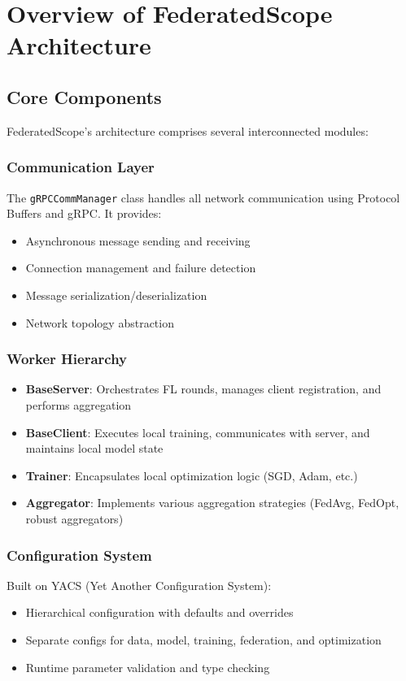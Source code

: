 \documentclass[11pt,conference]{article}
\begin{document}
\section{Overview of FederatedScope Architecture}

\subsection{Core Components}

FederatedScope's architecture comprises several interconnected modules:

\subsubsection{Communication Layer}
The \texttt{gRPCCommManager} class handles all network communication using Protocol Buffers and gRPC. It provides:
\begin{itemize}
    \item Asynchronous message sending and receiving
    \item Connection management and failure detection
    \item Message serialization/deserialization
    \item Network topology abstraction
\end{itemize}

\subsubsection{Worker Hierarchy}
\begin{itemize}
    \item \textbf{BaseServer}: Orchestrates FL rounds, manages client registration, and performs aggregation
    \item \textbf{BaseClient}: Executes local training, communicates with server, and maintains local model state
    \item \textbf{Trainer}: Encapsulates local optimization logic (SGD, Adam, etc.)
    \item \textbf{Aggregator}: Implements various aggregation strategies (FedAvg, FedOpt, robust aggregators)
\end{itemize}

\subsubsection{Configuration System}
Built on YACS (Yet Another Configuration System):
\begin{itemize}
    \item Hierarchical configuration with defaults and overrides
    \item Separate configs for data, model, training, federation, and optimization
    \item Runtime parameter validation and type checking
\end{itemize}
\end{document}
